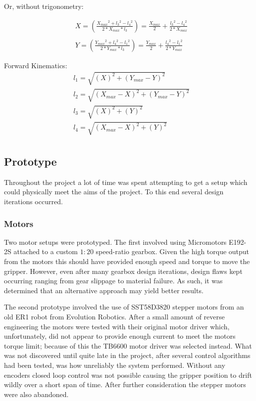 \documentclass[conference]{IEEEtran}
\begin{document}
Or, without trigonometry:

\begin{equation} \label{inverse_kinematics_1}
\begin{aligned}
&X = \left(\frac{X_{max}{}^2 + l_3{}^2 - l_4{}^2}{2*X_{max}*l_3}\right) = \frac{X_{max}}{2} + \frac{l_3{}^2 - l_4{}^2}{2*X_{max}}\\ \\
&Y = \left(\frac{Y_{max}{}^2 + l_4{}^2 - l_1{}^2}{2*Y_{max}*l_3}\right) = \frac{Y_{max}}{2} + \frac{l_4{}^2 - l_1{}^2}{2*Y_{max}}
\end{aligned}
\end{equation}

Forward Kinematics:
\begin{equation} \label{forward_kinematics_1}
\begin{aligned}
&l_1 = \sqrt{\left(X\right)^2 + \left(Y_{max}-Y\right)^2}\\
&l_2 = \sqrt{\left(X_{max}-X\right)^2 + \left(Y_{max}-Y\right)^2}\\
&l_3 = \sqrt{\left(X\right)^2 + \left(Y\right)^2}\\
&l_4 = \sqrt{\left(X_{max}-X\right)^2 + \left(Y\right)^2}\\
\end{aligned}
\end{equation}
\subsection{Prototype}
Throughout the project a lot of time was spent attempting to get a setup which could physically meet the aims of the project. To this end several design iterations occurred.

\subsubsection{Motors}
Two motor setups were prototyped. The first involved using Micromotors E192-2S attached to a custom $1:20$ speed-ratio gearbox. Given the high torque output from the motors this should have provided enough speed and torque to move the gripper. However, even after many gearbox design iterations, design flaws kept occurring ranging from gear slippage to material failure. As such, it was determined that an alternative approach may yield better results.

The second prototype involved the use of SST58D3820 stepper motors from an old ER1 robot from Evolution Robotics. After a small amount of reverse engineering the motors were tested with their original motor driver which, unfortunately, did not appear to provide enough current to meet the motors torque limit; because of this the TB6600 motor driver was selected instead. What was not discovered until quite late in the project, after several control algorithms had been tested, was how unreliably the system performed. Without any encoders closed loop control was not possible causing the gripper position to drift wildly over a short span of time. After further consideration the stepper motors were also abandoned.
\end{document}
